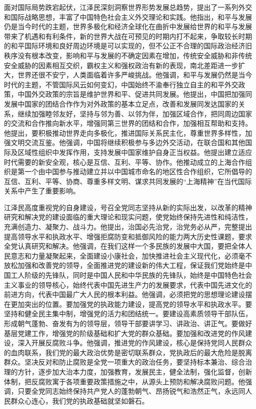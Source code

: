 \documentclass[UTF8, 11pt, oneside]{ctexart}
\begin{document}
面对国际局势跌宕起伏，江泽民深刻洞察世界形势发展总趋势，提出了一系列外交和国际战略思想，丰富了中国特色社会主义外交理论和实践。他指出，和平与发展仍是当今时代的主题，世界多极化和经济全球化在曲折中发展给世界的和平与发展带来了机遇和有利条件，新的世界大战在可预见的时期内打不起来，争取较长时期的和平国际环境和良好周边环境是可以实现的，但不公正不合理的国际政治经济旧秩序没有根本改变，影响和平与发展的不确定因素在增加，传统安全威胁和非传统安全威胁的因素相互交织，霸权主义和强权政治有新的表现，南北差距进一步扩大，世界还很不安宁，人类面临着许多严峻挑战。他强调，和平与发展仍然是当今时代的主题，不管国际风云如何变幻，中国始终不渝奉行独立自主的和平外交政策，中国外交政策的宗旨是维护世界和平、促进共同发展。他提出，中国把加强同发展中国家的团结合作作为对外政策的基本立足点，改善和发展同发达国家的关系，继续加强睦邻友好，坚持与邻为善、以邻为伴，加强区域合作，把同周边国家的交流和合作推向新水平，增强同第三世界的团结和合作，加强相互帮助和支持。他提出，要积极推动世界走向多极化，推进国际关系民主化，尊重世界多样性，加强文明交流互鉴。他强调，中国将继续积极参与多边外交活动，在联合国和其他国际及区域性组织中发挥作用，支持发展中国家维护自身正当权益。他提出建立适应时代需要的新安全观，核心是互信、互利、平等、协作。他推动成立的上海合作组织是第一个由中国参与推动建立并以中国城市命名的地区性合作组织，它所倡导的互信、互利、平等、协商、尊重多样文明、谋求共同发展的“上海精神”在当代国际关系中产生了重要影响。

江泽民高度重视党的自身建设，号召全党同志坚持从新的实际出发，以改革的精神研究和解决党的建设面临的重大理论和现实问题，使党始终保持先进性和纯洁性，充满创造力、凝聚力、战斗力。他提出，治国必先治党，治党务必从严，完整提出提高领导水平和执政水平、增强拒腐防变和抵御风险的能力两大历史性课题，要求全党认真研究和解决。他强调，在我们这样一个多民族的发展中大国，要把全体人民意志和力量凝聚起来，全面建设小康社会，加快推进社会主义现代化，必须毫不放松加强和改善党的领导，全面推进党的建设新的伟大工程，保证我们党始终是中国工人阶级的先锋队，同时是中国人民和中华民族的先锋队，始终是中国特色社会主义事业的领导核心，始终代表中国先进生产力的发展要求，代表中国先进文化的前进方向，代表中国最广大人民的根本利益。他强调，必须把党的思想理论建设摆在更加突出的位置。要加强党的执政能力建设，提高党的领导水平和执政水平。要坚持和健全民主集中制，增强党的活力和团结统一。要建设高素质领导干部队伍，形成朝气蓬勃、奋发有为的领导层，领导干部要讲学习、讲政治、讲正气。要做好基层党建工作，增强党的阶级基础和扩大党的群众基础。要加强和改进党的作风建设，深入开展反腐败斗争。他强调，推进党的作风建设，核心是保持党同人民群众的血肉联系，我们党的最大政治优势是密切联系群众，党执政后的最大危险是脱离群众。坚决反对和防止腐败是全党一项重大的政治任务，要坚持标本兼治、综合治理的方针，逐步加大治本力度，加强教育，发展民主，健全法制，强化监督，创新体制，把反腐败寓于各项重要政策措施之中，从源头上预防和解决腐败问题。他强调，只要全党同志始终保持共产党人的蓬勃朝气、昂扬锐气和浩然正气，永远同人民群众心连心，我们党的执政基础就坚如磐石。
\end{document}
